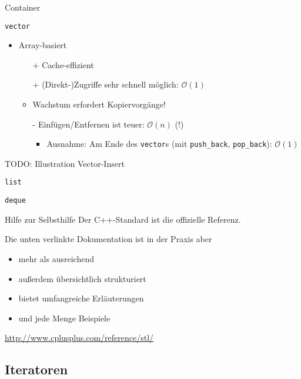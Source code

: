 \begin{frame}{Container}
	\begin{block}{\texttt{vector}}
		\begin{itemize}
			\item Array-basiert
			\begin{itemize}
				\item[+] Cache-effizient
				\item[+] (Direkt-)Zugriffe sehr schnell möglich: $\mathcal{O}(1)$
				\item Wachstum erfordert Kopiervorgänge!
				\item[-] Einfügen/Entfernen ist teuer: $\mathcal{O}(n)$ (!)
					\begin{itemize}
						\item Ausnahme: Am Ende des \verb|vector|s (mit \verb|push_back|, \verb|pop_back|): $\mathcal{O}(1)$
					\end{itemize}
			\end{itemize}
		\end{itemize}
		
		TODO: Illustration Vector-Insert
	\end{block}
	
	\begin{block}{\texttt{list}}
	
	\end{block}
	
	\begin{block}{\texttt{deque}}
	
	\end{block}
\end{frame}

\begin{frame}{Hilfe zur Selbsthilfe}
	Der C++-Standard ist die offizielle Referenz. 
	
	Die unten verlinkte Dokumentation ist in der Praxis aber
	\begin{itemize}
		\item mehr als ausreichend
		\item außerdem übersichtlich strukturiert
		\item bietet umfangreiche Erläuterungen
		\item und jede Menge Beispiele
	\end{itemize}
	
	\begin{center}
		\url{http://www.cplusplus.com/reference/stl/}
	\end{center}
\end{frame}


\subsection{Iteratoren}



